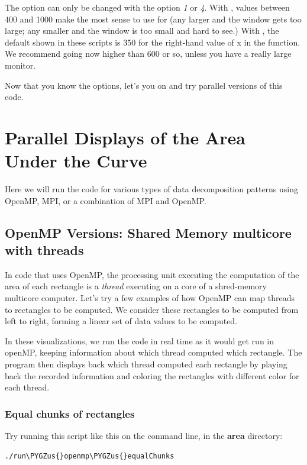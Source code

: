\documentclass[letterpaper,10pt,openany,oneside]{sphinxmanual}
\def\PYGZus{\char`\_}
\begin{document}
The  option can only be changed with the  option \emph{1} or \emph{4}. With , values between 400 and 1000 make the most sense to use for  (any larger and the window gets too large; any smaller and the window is too small and hard to see.) With , the default shown in these scripts is 350 for the right-hand value of x in the function. We recommend going now higher than 600 or so, unless you have a really large monitor.

Now that you know the options, let's you on and try parallel versions of this code.


\chapter{Parallel Displays of the Area Under the Curve}
\label{ParallelVis::doc}\label{ParallelVis:parallel-displays-of-the-area-under-the-curve}
Here we will run the code for various types of data decomposition patterns using OpenMP, MPI, or a combination of MPI and OpenMP.


\section{OpenMP Versions: Shared Memory multicore with threads}
\label{ParallelVis:openmp-versions-shared-memory-multicore-with-threads}
In code that uses OpenMP, the processing unit executing the computation of the area of each rectangle is a \emph{thread} executing on a core of a shred-memory multicore computer.  Let's try a few examples of how OpenMP can map threads to rectangles to be computed.  We consider these rectangles to be computed from left to right, forming a linear set of data values to be computed.

In these visualizations, we run the code in real time as it would get run in openMP, keeping information about which thread computed which rectangle.  The program then displays back which thread computed each rectangle by playing back the recorded information and coloring the rectangles with different color for each thread.


\subsection{Equal chunks of rectangles}
\label{ParallelVis:equal-chunks-of-rectangles}
Try running this script like this on the command line, in the \textbf{area} directory:

\begin{Verbatim}[commandchars=\\\{\}]
./run\PYGZus{}openmp\PYGZus{}equalChunks
\end{Verbatim}
\end{document}
